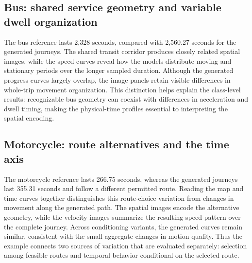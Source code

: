 \subsection{Bus: shared service geometry and variable dwell organization}
The bus reference lasts 2,328 seconds, compared with 2,560.27 seconds for the generated journeys. The shared transit corridor produces closely related spatial images, while the speed curves reveal how the models distribute moving and stationary periods over the longer sampled duration. Although the generated progress curves largely overlap, the image panels retain visible differences in whole-trip movement organization. This distinction helps explain the class-level results: recognizable bus geometry can coexist with differences in acceleration and dwell timing, making the physical-time profiles essential to interpreting the spatial encoding.
\FloatBarrier

\subsection{Motorcycle: route alternatives and the time axis}
The motorcycle reference lasts 266.75 seconds, whereas the generated journeys last 355.31 seconds and follow a different permitted route. Reading the map and time curves together distinguishes this route-choice variation from changes in movement along the generated path. The spatial images encode the alternative geometry, while the velocity images summarize the resulting speed pattern over the complete journey. Across conditioning variants, the generated curves remain similar, consistent with the small aggregate changes in motion quality. Thus the example connects two sources of variation that are evaluated separately: selection among feasible routes and temporal behavior conditional on the selected route.
\FloatBarrier

